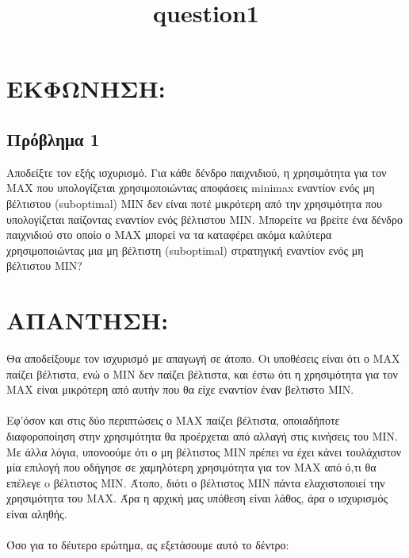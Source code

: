 \documentclass{article}
\begin{document}
\title{\textlatin{question1}}
\maketitle
\section*{ΕΚΦΩΝΗΣΗ:}

\subsection*{Πρόβλημα 1}
Αποδείξτε τον εξής ισχυρισμό. Για κάθε δένδρο παιχνιδιού, η χρησιμότητα για τον \textlatin{MAX} που
υπολογίζεται χρησιμοποιώντας αποφάσεις \textlatin{minimax} εναντίον ενός μη βέλτιστου (\textlatin{suboptimal}) \textlatin{MIN} δεν
είναι ποτέ μικρότερη από την χρησιμότητα που υπολογίζεται παίζοντας εναντίον ενός βέλτιστου \textlatin{MIN}.
Μπορείτε να βρείτε ένα δένδρο παιχνιδιού στο οποίο ο \textlatin{MAX} μπορεί να τα καταφέρει ακόμα καλύτερα
χρησιμοποιώντας μια μη βέλτιστη (\textlatin{suboptimal}) στρατηγική εναντίον ενός μη βέλτιστου \textlatin{MIN}?


\section*{ΑΠΑΝΤΗΣΗ:}

Θα αποδείξουμε τον ισχυρισμό με απαγωγή σε άτοπο. Οι υποθέσεις είναι ότι ο \textlatin{MAX} παίζει βέλτιστα, ενώ ο \textlatin{MIN} δεν παίζει βέλτιστα, και έστω ότι η χρησιμότητα για τον \textlatin{MAX} είναι μικρότερη από αυτήν που θα είχε εναντίον έναν βελτιστο \textlatin{MIN}.
\\ \\
Εφ'όσον και στις δύο περιπτώσεις ο \textlatin{MAX} παίζει βέλτιστα, οποιαδήποτε διαφοροποίηση στην χρησιμότητα θα προέρχεται από αλλαγή στις κινήσεις του \textlatin{MIN}. Με άλλα λόγια, υπονοούμε ότι ο μη βέλτιστος \textlatin{MIN} πρέπει να έχει κάνει τουλάχιστον μία επιλογή που οδήγησε σε χαμηλότερη χρησιμότητα για τον \textlatin{MAX} από ό,τι θα επέλεγε o βέλτιστος \textlatin{MIN}. Άτοπο, διότι ο βέλτιστος \textlatin{MIN} πάντα ελαχιστοποιεί την χρησιμότητα του \textlatin{MAX}.
Άρα η αρχική μας υπόθεση είναι λάθος, άρα ο ισχυρισμός είναι αληθής.
\\ \\
Όσο για το δέυτερο ερώτημα, ας εξετάσουμε αυτό το δέντρο:

\\ \\
\end{document}
